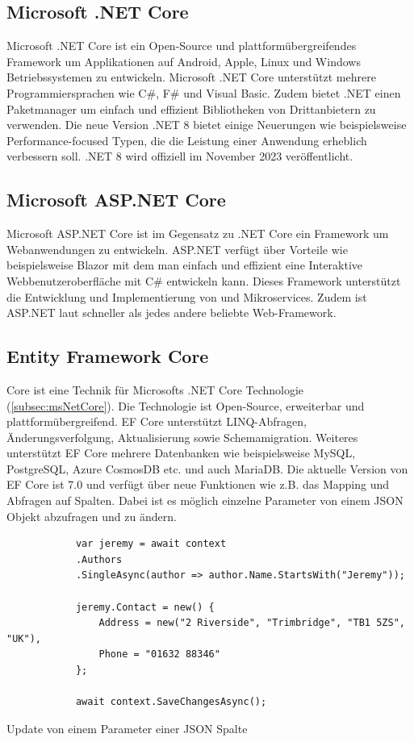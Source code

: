 \documentclass[a4paper, fontsize=11pt, parskip=half, twoside]{scrreprt}
\begin{document}
	\subsection{Microsoft .NET Core} \label{subsec:msNetCore}
	Microsoft .NET Core ist ein Open-Source und plattformübergreifendes Framework um Applikationen auf Android, Apple, Linux und Windows Betriebssystemen zu entwickeln.
	Microsoft .NET Core unterstützt mehrere Programmiersprachen wie C\#, F\# und Visual Basic.
	Zudem bietet .NET einen Paketmanager um einfach und effizient Bibliotheken von Drittanbietern zu verwenden.
	Die neue Version .NET 8 bietet einige Neuerungen wie beispielsweise Performance-focused Typen, die die Leistung einer Anwendung erheblich verbessern soll.
	.NET 8 wird offiziell im November 2023 veröffentlicht.
	
	\textcite{billwagner_net_nodate}
	
	\subsection{Microsoft ASP.NET Core}
	Microsoft ASP.NET Core ist im Gegensatz zu .NET Core ein Framework um Webanwendungen zu entwickeln. 
	ASP.NET verfügt über Vorteile wie beispielsweise Blazor mit dem man einfach und effizient eine Interaktive Webbenutzeroberfläche mit C\# entwickeln kann.
	Dieses Framework unterstützt die Entwicklung und Implementierung von  und Mikroservices.
	Zudem ist ASP.NET laut \textcite{noauthor_techempower_nodate} schneller als jedes andere beliebte Web-Framework.
	
	\textcite{billwagner_net_nodate}
	
	\subsection{Entity Framework Core}
	 Core ist eine  Technik für Microsofts .NET Core Technologie (\autoref{subsec:msNetCore}). 
	Die Technologie ist Open-Source, erweiterbar und plattformübergreifend.
	\ac{EF} Core unterstützt LINQ-Abfragen, Änderungsverfolgung, Aktualisierung sowie Schemamigration.
	Weiteres unterstützt \ac{EF} Core mehrere Datenbanken wie beispielsweise MySQL, PostgreSQL, Azure CosmosDB etc. und auch MariaDB.
	Die aktuelle Version von \ac{EF} Core ist 7.0 und verfügt über neue Funktionen wie z.B. das Mapping und Abfragen auf  Spalten. 
	Dabei ist es möglich einzelne Parameter von einem \ac{JSON} Objekt abzufragen und zu ändern.
	
	\begin{listing}[ht]
		\begin{verbatim}
			var jeremy = await context
			.Authors
			.SingleAsync(author => author.Name.StartsWith("Jeremy"));
			
			jeremy.Contact = new() { 
				Address = new("2 Riverside", "Trimbridge", "TB1 5ZS", "UK"), 
				Phone = "01632 88346" 
			};
		
			await context.SaveChangesAsync();
		\end{verbatim}
		\caption{Update von einem Parameter einer \acl{JSON} Spalte}
	\end{listing}
\end{document}
